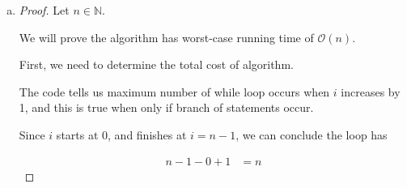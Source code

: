 \documentclass[12pt]{article}
\begin{document}
\begin{enumerate}[a.]
\begin{itemize}
\begin{itemize}
        \end{itemize}

        \item Realized the need to learn how to organize ideas for proof
        \item Realized the need to learn how to connect the dots or lay structure to proofs given sets of ideas
        \item Realized concepts involved are 1. finding examples 2. finding patterns in example
        3. generalizing patterns 4. write how am i going to solve problem 5. lay out big ideas
        6. chunk out big ideas into smaller parts 7. solve the small parts
        \item Realized building a large proof without organizing ideas feels like
        jumping into solving pramp problems without pseudocode on how to solve it.

        \bigskip

        I wonder how to lay pseudocode or organize ideas for proofs...
        \item Realized I am keep losing details because my brain can't hold
        too much of information.
        \item Realized writing proof feels similar to writing algorithms

    \end{itemize}

    \item

    \begin{proof}
        Let $n \in \mathbb{N}$.

        \bigskip

        We will prove the algorithm has worst-case running time of $\mathcal{O}(n)$.

        \bigskip

        First, we need to determine the total cost of algorithm.

        \bigskip

        The code tells us maximum number of while loop occurs when $i$ increases
        by 1, and this is true when only if branch of statements occur.

        \bigskip

        Since $i$ starts at 0, and finishes at $i = n-1$, we can conclude the
        loop has

        \begin{align}
            n-1-0+1 &= n
        \end{align}


\end{proof}
\end{enumerate}
\end{document}

